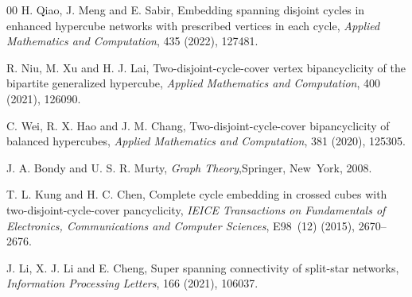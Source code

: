 \documentclass[12pt,a4paper]{amsart}
\theoremstyle{definition}
\begin{document}
\begin{thebibliography}{00}
         H. Qiao, J. Meng and E. Sabir, Embedding spanning disjoint cycles in enhanced hypercube networks with prescribed vertices in each cycle,
        \textit{Applied Mathematics and Computation}, 435 (2022), 127481.

         R. Niu, M. Xu and H. J. Lai, Two-disjoint-cycle-cover vertex bipancyclicity of the bipartite generalized hypercube,
        \textit{Applied Mathematics and Computation}, 400 (2021), 126090.


         C. Wei, R. X. Hao and J. M. Chang, Two-disjoint-cycle-cover bipancyclicity of balanced hypercubes,
        \textit{Applied Mathematics and Computation}, 381 (2020), 125305.

         J. A. Bondy and U. S. R. Murty,
        \textit{Graph Theory},Springer, New~York, 2008.

         T. L. Kung and H. C. Chen, Complete cycle embedding in crossed cubes with two-disjoint-cycle-cover pancyclicity,
        \textit{IEICE Transactions on Fundamentals of Electronics, Communications and Computer Sciences}, E98~(12) (2015), 2670--2676.

         J. Li, X. J. Li and E. Cheng, Super spanning connectivity of split-star networks,
        \textit{Information Processing Letters}, 166 (2021), 106037.















		
	\end{thebibliography}
\end{document}
